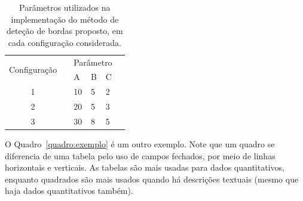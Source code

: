 \documentclass[a4paper, 12pt]{ppgeb}
\begin{document}
\begin{table}[h]
\centering
\caption{Parâmetros utilizados na implementação do método de deteção de bordas proposto, em cada configuração considerada.}\label{tab:exemplo}
\begin{tabular}{ccllll}
\cline{1-5}
\multirow{2}{*}{Configuração} && \multicolumn{3}{l}{\hspace*{12pt}Parâmetro}&  \\
&& \hspace{4pt}A\hspace{4pt} & \hspace{4pt}B\hspace{4pt} & \hspace{4pt}C\hspace{4pt} & \\ \cline{1-5}
1                             && \hspace{4pt}10\hspace{4pt}        & \hspace{4pt}5\hspace{4pt}       & \hspace{4pt}2\hspace{4pt}       &  \\
2                             && \hspace{4pt}20\hspace{4pt}        & \hspace{4pt}5\hspace{4pt}       & \hspace{4pt}3\hspace{4pt}       &  \\
3                             && \hspace{4pt}30\hspace{4pt}        & \hspace{4pt}8\hspace{4pt}       & \hspace{4pt}5\hspace{4pt}       &  \\ \cline{1-5}
\end{tabular}
\end{table}

O Quadro~\ref{quadro:exemplo} é um outro exemplo. Note que um quadro se diferencia de uma tabela pelo uso de campos fechados, por meio de linhas horizontais e verticais. As tabelas são mais usadas para dados quantitativos, enquanto quadrados são mais usados quando há descrições textuais (mesmo que haja dados quantitativos também).
\end{document}
